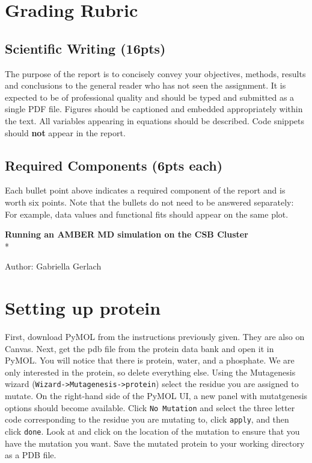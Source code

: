 \documentclass[11pt]{article}
\begin{document}
\section*{Grading Rubric}

\subsection*{Scientific Writing (16pts)}
The purpose of the report is to concisely convey your objectives, methods, results and conclusions to the general reader who has not seen the assignment. It is expected to be of professional quality and should be typed and submitted as a single PDF file. Figures should be captioned and embedded appropriately within the text. All variables appearing in equations should be described. Code snippets should {\bf not} appear in the report.

\subsection*{Required Components (6pts each)}
Each bullet point above indicates a required component of the report and is worth six points. Note that the bullets do not need to be answered separately: For example, data values and functional fits should appear on the same plot.



\newpage
\begin{center}
    \Large{\textbf{Running an AMBER MD simulation on the CSB Cluster}}\\*
\end{center}
\small{Author: Gabriella Gerlach}

\section*{Setting up protein}
First, download PyMOL from the instructions previously given. They are also on Canvas. Next, get the pdb file from the protein data bank and open it in PyMOL. You will notice that there is protein, water, and a phosphate. We are only interested in the protein, so delete everything else. 
\newline
\newline
Using the Mutagenesis wizard (\texttt{Wizard->Mutagenesis->protein}) select the residue you are assigned to mutate. On the right-hand side of the PyMOL UI, a new panel with mutatgenesis options should become available. Click \texttt{No Mutation} and select the three letter code corresponding to the residue you are mutating to, click \texttt{apply}, and then click \texttt{done}. Look at and click on the location of the mutation to ensure that you have the mutation you want. 
\newline
\newline
Save the mutated protein to your working directory as a PDB file. 
\end{document}
